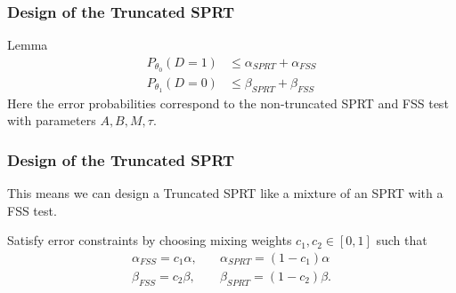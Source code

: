 \documentclass[10pt]{beamer}
\begin{document}
\begin{frame}
\frametitle{Design of the Truncated SPRT}

\begin{block}{Lemma}
\[
\begin{split}
P_{\theta_0}(D = 1) &\leq \alpha_{SPRT} + \alpha_{FSS} \\
P_{\theta_1}(D = 0) &\leq \beta_{SPRT} + \beta_{FSS}
\end{split}
\]
Here the error probabilities correspond to the non-truncated SPRT and FSS test with parameters $A, B, M, \tau$.
\end{block}


\end{frame}

\begin{frame}
\frametitle{Design of the Truncated SPRT}

This means we can design a Truncated SPRT like a mixture of an SPRT with a FSS test.

Satisfy error constraints by choosing mixing weights $c_1, c_2 \in [0, 1]$ such that
\[
\begin{split}
\alpha_{FSS} = c_1 \alpha, \quad &\alpha_{SPRT} = (1 - c_1) \alpha \\
\beta_{FSS} = c_2 \beta, \quad &\beta_{SPRT} = (1 - c_2) \beta.
\end{split}
\]

\end{frame}
\end{document}
